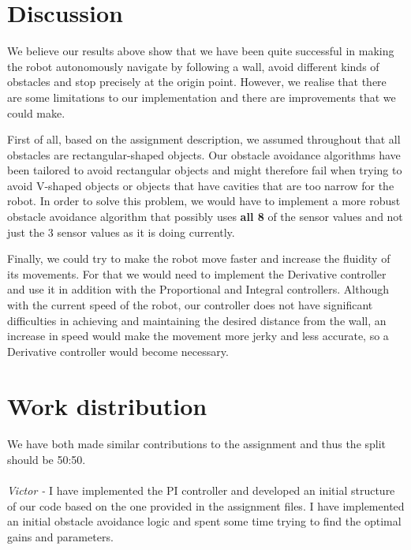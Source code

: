 \documentclass[10pt,a4paper]{article}
\begin{document}
\begin{multicols}{2}
\section{Discussion}\label{discussion}

We believe our results above show that we have been quite successful in
making the robot autonomously navigate by following a wall, avoid
different kinds of obstacles and stop precisely at the origin point.
However, we realise that there are some limitations to our
implementation and there are improvements that we could make.

First of all, based on the assignment description, we assumed
throughout that all obstacles are rectangular-shaped objects. Our
obstacle avoidance algorithms have been tailored to avoid rectangular
objects and might therefore fail when trying to avoid V-shaped objects
or objects that have cavities that are too narrow for the robot. In order
to solve this problem, we would have to implement a more robust obstacle
avoidance algorithm that possibly uses \textbf{all 8} of the sensor
values and not just the 3 sensor values as it is doing currently.

Finally, we could try to make the robot move faster and increase the
fluidity of its movements. For that we would need to implement the
Derivative controller and use it in addition with the Proportional and
Integral controllers. Although with the current speed of the robot, our
controller does not have significant difficulties in achieving and
maintaining the desired distance from the wall, an increase in speed
would make the movement more jerky and less accurate, so a Derivative
controller would become necessary.

\section{Work distribution}\label{work-distribution}

\paragraph{} We have both made similar contributions to the assignment and thus the
split should be 50:50. 
\paragraph{} \emph{Victor -} I have implemented the PI
controller and developed an initial structure of our code based on the
one provided in the assignment files. I have implemented an initial
obstacle avoidance logic and spent some time trying to find the optimal
gains and parameters. 

\end{multicols}
\end{document}
